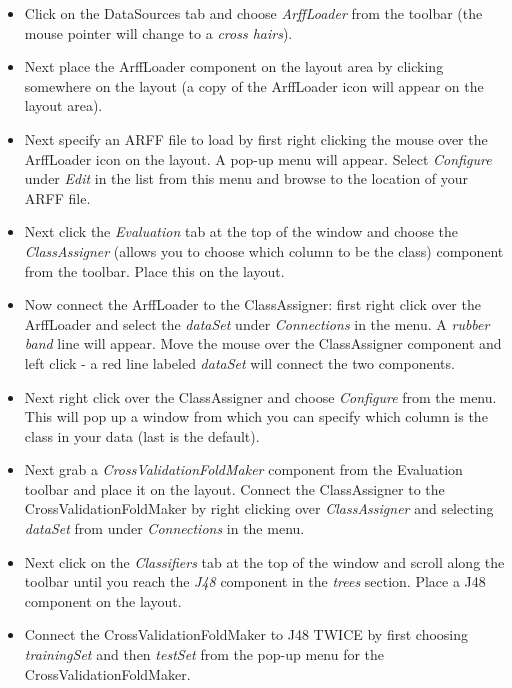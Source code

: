\begin{itemize}
	\item Click on the DataSources tab and choose \textit{ArffLoader} from the
	toolbar (the mouse pointer will change to a \textit{cross hairs}).

	\item Next place the ArffLoader component on the layout area by clicking
	somewhere on the layout (a copy of the ArffLoader icon will appear on
	the layout area).

	\item Next specify an ARFF file to load by first right clicking the mouse
	over the ArffLoader icon on the layout. A pop-up menu will
	appear. Select \textit{Configure} under \textit{Edit} in the list from this menu and
	browse to the location of your ARFF file.

	\item Next click the \textit{Evaluation} tab at the top of the window and choose the
	\textit{ClassAssigner} (allows you to choose which column to be the class)
	component from the toolbar. Place this on the layout.

	\item Now connect the ArffLoader to the ClassAssigner: first right click
	over the ArffLoader and select the \textit{dataSet} under \textit{Connections} in
	the menu. A \textit{rubber band} line will appear. Move the mouse over the
	ClassAssigner component and left click - a red line labeled \textit{dataSet}
	will connect the two components.

	\item Next right click over the ClassAssigner and choose \textit{Configure} from
	the menu. This will pop up a window from which you can specify which
	column is the class in your data (last is the default).

	\item Next grab a \textit{CrossValidationFoldMaker} component from the Evaluation
	toolbar and place it on the layout. Connect the ClassAssigner to the
	CrossValidationFoldMaker by right clicking over \textit{ClassAssigner} and
	selecting \textit{dataSet} from under \textit{Connections} in the menu.

	\item Next click on the \textit{Classifiers} tab at the top of the window and
	scroll along the toolbar until you reach the \textit{J48} component in the
	\textit{trees} section. Place a J48 component on the layout.

	\item Connect the CrossValidationFoldMaker to J48 TWICE by first choosing
	\textit{trainingSet} and then \textit{testSet} from the pop-up menu for the
	CrossValidationFoldMaker.


\end{itemize}
